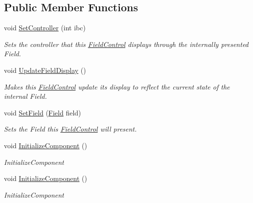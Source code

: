 \subsection*{Public Member Functions}
\begin{DoxyCompactItemize}
\item 
void \hyperlink{class_m_b_c_1_1_app_1_1_w_p_f_1_1_field_control_abdf9f4f572eb3f9f84caee3b0a9729a1}{Set\-Controller} (int ibc)
\begin{DoxyCompactList}\small\item\em Sets the controller that this \hyperlink{class_m_b_c_1_1_app_1_1_w_p_f_1_1_field_control}{Field\-Control} displays through the internally presented Field.\end{DoxyCompactList}\item 
\hypertarget{class_m_b_c_1_1_app_1_1_w_p_f_1_1_field_control_a5f73d69fb63c3fa2e03b145d66f914b6}{void \hyperlink{class_m_b_c_1_1_app_1_1_w_p_f_1_1_field_control_a5f73d69fb63c3fa2e03b145d66f914b6}{Update\-Field\-Display} ()}\label{class_m_b_c_1_1_app_1_1_w_p_f_1_1_field_control_a5f73d69fb63c3fa2e03b145d66f914b6}

\begin{DoxyCompactList}\small\item\em Makes this \hyperlink{class_m_b_c_1_1_app_1_1_w_p_f_1_1_field_control}{Field\-Control} update its display to reflect the current state of the internal Field.\end{DoxyCompactList}\item 
void \hyperlink{class_m_b_c_1_1_app_1_1_w_p_f_1_1_field_control_a77fd051799f4c82c3ca10c4650576d0e}{Set\-Field} (\hyperlink{class_m_b_c_1_1_core_1_1_field}{Field} field)
\begin{DoxyCompactList}\small\item\em Sets the Field this \hyperlink{class_m_b_c_1_1_app_1_1_w_p_f_1_1_field_control}{Field\-Control} will present.\end{DoxyCompactList}\item 
void \hyperlink{class_m_b_c_1_1_app_1_1_w_p_f_1_1_field_control_a42a985ed0daa8768932b77eaf87b65b4}{Initialize\-Component} ()
\begin{DoxyCompactList}\small\item\em Initialize\-Component \end{DoxyCompactList}\item 
void \hyperlink{class_m_b_c_1_1_app_1_1_w_p_f_1_1_field_control_a42a985ed0daa8768932b77eaf87b65b4}{Initialize\-Component} ()
\begin{DoxyCompactList}\small\item\em Initialize\-Component \end{DoxyCompactList}\end{DoxyCompactItemize}
